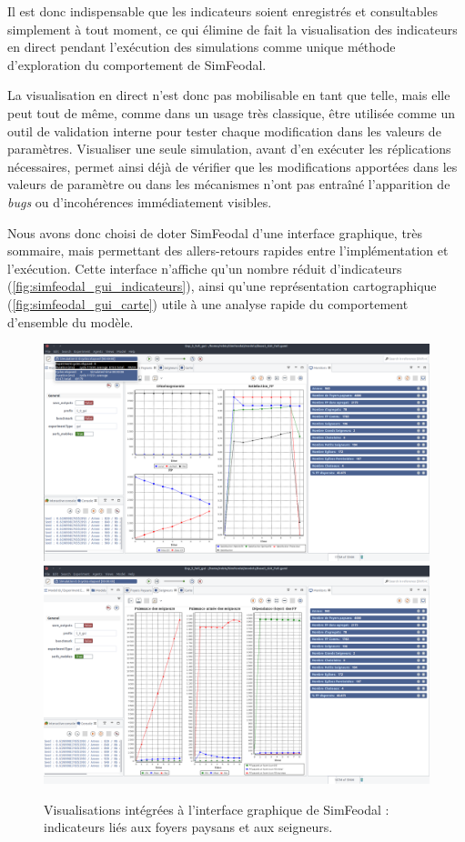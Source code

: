 	Il est donc indispensable que les indicateurs soient enregistrés et consultables simplement à tout moment, ce qui élimine de fait la visualisation des indicateurs en direct pendant l'exécution des simulations comme unique méthode d'exploration du comportement de SimFeodal.

	La visualisation en direct n'est donc pas mobilisable en tant que telle, mais elle peut tout de même, comme dans un usage très classique, être utilisée comme un outil de validation interne pour tester chaque modification dans les valeurs de paramètres.
	Visualiser une seule simulation, avant d'en exécuter les réplications nécessaires, permet ainsi déjà de vérifier que les modifications apportées dans les valeurs de paramètre ou dans les mécanismes n'ont pas entraîné l'apparition de \textit{bugs} ou d'incohérences immédiatement visibles.

	Nous avons donc choisi de doter SimFeodal d'une interface graphique, très sommaire, mais permettant des allers-retours rapides entre l'implémentation et l'exécution.
	Cette interface n'affiche qu'un nombre réduit d'indicateurs (\autoref{fig:simfeodal_gui_indicateurs}), ainsi qu'une représentation cartographique (\autoref{fig:simfeodal_gui_carte}) utile à une analyse rapide du comportement d'ensemble du modèle.

\begin{figure}[H]
	\captionsetup{width=\linewidth}
	\includegraphics[width=0.5\linewidth]{img/SimFeodal_GUI_FP.png}
	\includegraphics[width=0.5\linewidth]{img/SimFeodal_GUI_seigneurs.png}
	\caption{Visualisations intégrées à l'interface graphique de SimFeodal : indicateurs liés aux foyers paysans et aux seigneurs.} 
	\label{fig:simfeodal_gui_indicateurs} 
\end{figure}

